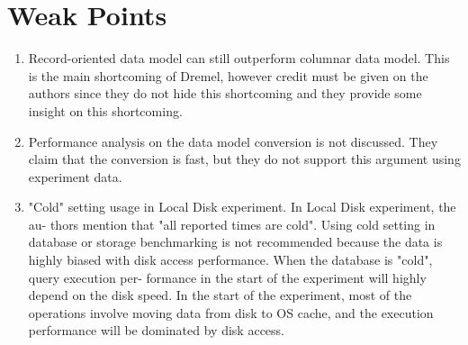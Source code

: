 \documentclass[twocolumn]{article}
\newcommand{\be}{\begin{enumerate}}
\newcommand{\ee}{\end{enumerate}}
\newcommand{\ii}{\item}
\begin{document}
\section{Weak Points}
\be
\ii Record-oriented data model can still outperform columnar data model. This is the main shortcoming of Dremel, however credit must be given on the authors since they do not hide this shortcoming and they provide some insight on this shortcoming.
\ii Performance analysis on the data model conversion is not discussed. They claim that the conversion is fast, but they do not support this argument using experiment data.
\ii "Cold" setting usage in Local Disk experiment. In Local Disk experiment, the au- thors mention that "all reported times are cold". Using cold setting in database or storage benchmarking is not recommended because the data is highly biased with disk access performance. When the database is "cold", query execution per- formance in the start of the experiment will highly depend on the disk speed. In the start of the experiment, most of the operations involve moving data from disk to OS cache, and the execution performance will be dominated by disk access.
\ee




\end{document}
